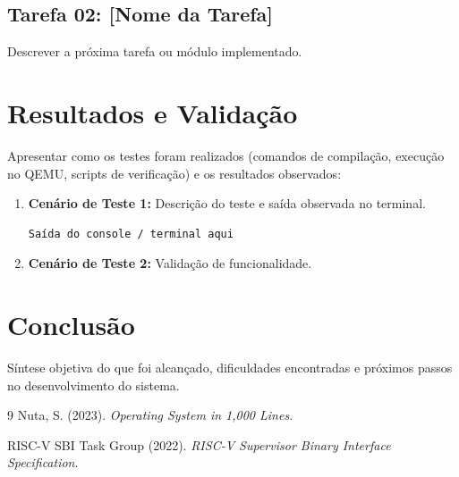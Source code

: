 \documentclass[12pt]{article}
\begin{document}
\subsection{Tarefa 02: [Nome da Tarefa]}

Descrever a próxima tarefa ou módulo implementado.


\section{Resultados e Validação}

Apresentar como os testes foram realizados (comandos de compilação, execução no QEMU, scripts de verificação) e os resultados observados:
\begin{enumerate}
    \item \textbf{Cenário de Teste 1:} Descrição do teste e saída observada no terminal.
\begin{verbatim}
Saída do console / terminal aqui
\end{verbatim}
    \item \textbf{Cenário de Teste 2:} Validação de funcionalidade.
\end{enumerate}

\section{Conclusão}

Síntese objetiva do que foi alcançado, dificuldades encontradas e próximos passos no desenvolvimento do sistema.

\begin{thebibliography}{9}
Nuta, S. (2023). \textit{Operating System in 1,000 Lines}.

RISC-V SBI Task Group (2022). \textit{RISC-V Supervisor Binary Interface Specification}.
\end{thebibliography}

% 
% 
\end{document}
